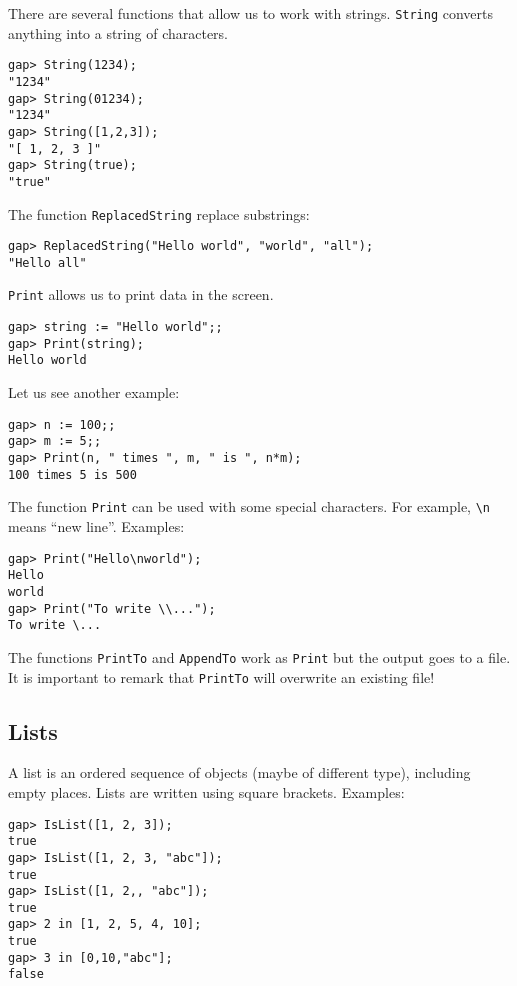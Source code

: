 There are several functions that allow us to work with strings.
\lstinline{String} converts anything into a string of characters.
\begin{lstlisting}
gap> String(1234);
"1234"
gap> String(01234);
"1234"
gap> String([1,2,3]);
"[ 1, 2, 3 ]"
gap> String(true);
"true"
\end{lstlisting}
The function \lstinline{ReplacedString} replace substrings: 
\begin{lstlisting}
gap> ReplacedString("Hello world", "world", "all");
"Hello all"
\end{lstlisting}

\lstinline{Print} allows us to print data in the screen. 
\begin{lstlisting}
gap> string := "Hello world";;
gap> Print(string);
Hello world
\end{lstlisting}
Let us see another example:
\begin{lstlisting}
gap> n := 100;;                                                       
gap> m := 5;;
gap> Print(n, " times ", m, " is ", n*m);
100 times 5 is 500
\end{lstlisting}
The function \lstinline{Print} can be used with some special characters. For example, 
\lstinline{\n} means ``new line''. Examples:
\begin{lstlisting}
gap> Print("Hello\nworld");
Hello
world
gap> Print("To write \\...");
To write \... 
\end{lstlisting}
The functions \lstinline{PrintTo} and \lstinline{AppendTo} work as \lstinline{Print} but the output goes
to a file. It is important to remark that \lstinline{PrintTo} will overwrite an existing file!

\subsection*{Lists}

A list is an ordered sequence of objects (maybe of different type), including
empty places. Lists are written using square brackets. Examples:
\begin{lstlisting}
gap> IsList([1, 2, 3]);
true
gap> IsList([1, 2, 3, "abc"]);
true
gap> IsList([1, 2,, "abc"]);
true
gap> 2 in [1, 2, 5, 4, 10];
true
gap> 3 in [0,10,"abc"];
false
\end{lstlisting}

